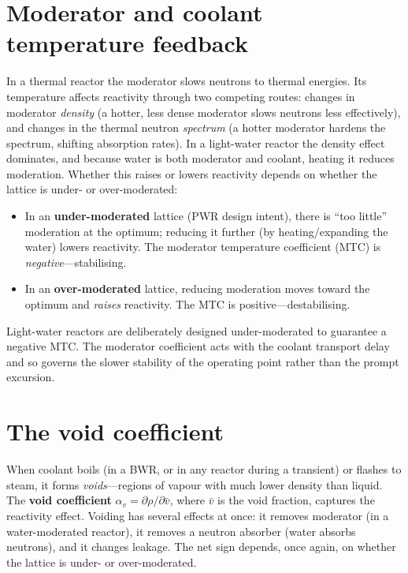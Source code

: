 
\section{Moderator and coolant temperature feedback}

In a thermal reactor the moderator slows neutrons to thermal energies. Its
temperature affects reactivity through two competing routes: changes in moderator
\emph{density} (a hotter, less dense moderator slows neutrons less effectively),
and changes in the thermal neutron \emph{spectrum} (a hotter moderator hardens
the spectrum, shifting absorption rates). In a light-water reactor the density
effect dominates, and because water is both moderator and coolant, heating it
reduces moderation. Whether this raises or lowers reactivity depends on whether
the lattice is under- or over-moderated:

\begin{itemize}[nosep]
\item In an \textbf{under-moderated} lattice (PWR design intent), there is ``too
little'' moderation at the optimum; reducing it further (by heating/expanding the
water) lowers reactivity. The moderator temperature coefficient (MTC) is
\emph{negative}---stabilising.
\item In an \textbf{over-moderated} lattice, reducing moderation moves toward the
optimum and \emph{raises} reactivity. The MTC is positive---destabilising.
\end{itemize}

Light-water reactors are deliberately designed under-moderated to guarantee a
negative MTC. The moderator coefficient acts with the coolant transport delay
and so governs the slower stability of the operating point rather than the prompt
excursion.

\section{The void coefficient}

When coolant boils (in a BWR, or in any reactor during a transient) or flashes to
steam, it forms \emph{voids}---regions of vapour with much lower density than
liquid. The \textbf{void coefficient} $\alpha_v=\partial\rho/\partial \bar v$,
where $\bar v$ is the void fraction, captures the reactivity effect. Voiding has
several effects at once: it removes moderator (in a water-moderated reactor), it
removes a neutron absorber (water absorbs neutrons), and it changes leakage. The
net sign depends, once again, on whether the lattice is under- or
over-moderated.

